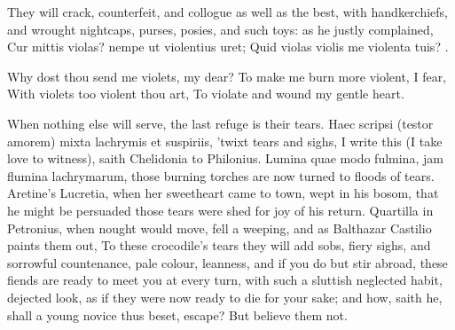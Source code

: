 They will crack, counterfeit, and collogue as well as the best,
with handkerchiefs, and wrought nightcaps, purses, posies, and such
toys: as he justly complained,
Cur mittis violas? nempe ut violentius uret;
Quid violas violis me violenta tuis? \etc{}.

Why dost thou send me violets, my dear?
To make me burn more violent, I fear,
With violets too violent thou art,
To violate and wound my gentle heart.

When nothing else will serve, the last refuge is their tears. Haec
scripsi (testor amorem) mixta lachrymis et suspiriis, 'twixt tears and
sighs, I write this (I take love to witness), saith Chelidonia to
Philonius. Lumina quae modo fulmina, jam flumina lachrymarum, those
burning torches are now turned to floods of tears. Aretine's Lucretia,
when her sweetheart came to town, wept in his bosom, that he
might be persuaded those tears were shed for joy of his return.
Quartilla in Petronius, when nought would move, fell a weeping, and as
Balthazar Castilio paints them out, To these crocodile's tears
they will add sobs, fiery sighs, and sorrowful countenance, pale
colour, leanness, and if you do but stir abroad, these fiends are ready
to meet you at every turn, with such a sluttish neglected habit,
dejected look, as if they were now ready to die for your sake; and how,
saith he, shall a young novice thus beset, escape? But believe them
not.

